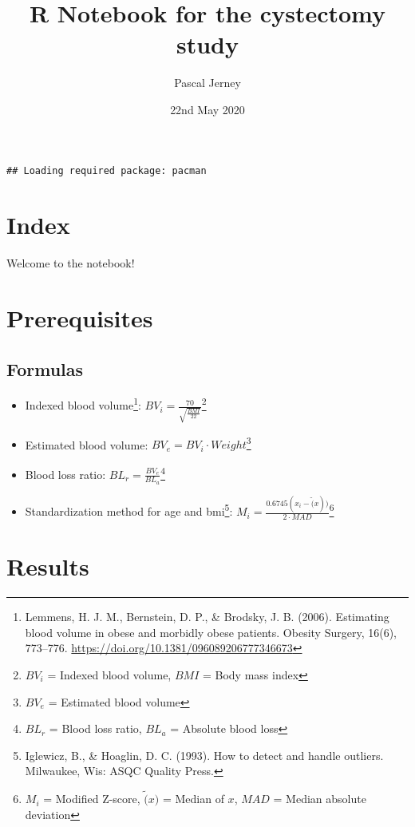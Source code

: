 \documentclass[
]{article}
\title{R Notebook for the cystectomy study}
\author{Pascal Jerney}
\date{22nd May 2020}
\providecommand{\tightlist}{%
  \setlength{\itemsep}{0pt}\setlength{\parskip}{0pt}}
\begin{document}
\maketitle

\begin{verbatim}
## Loading required package: pacman
\end{verbatim}

\hypertarget{index}{%
\section{Index}\label{index}}

Welcome to the notebook!

\hypertarget{prerequisites}{%
\section{Prerequisites}\label{prerequisites}}

\hypertarget{formulas}{%
\subsection{Formulas}\label{formulas}}

\begin{itemize}
\tightlist
\item
  Indexed blood volume\footnote{Lemmens, H. J. M., Bernstein, D. P., \& Brodsky, J. B. (2006). Estimating blood volume in obese and morbidly obese patients. Obesity Surgery, 16(6), 773--776. \url{https://doi.org/10.1381/096089206777346673}}: \(BV_i = \frac{70}{\sqrt{\frac{BMI}{22}}}\)\footnote{\(BV_i\) = Indexed blood volume, \(BMI\) = Body mass index}
\item
  Estimated blood volume: \(BV_e = BV_i \cdot Weight\)\footnote{\(BV_e\) = Estimated blood volume}
\item
  Blood loss ratio: \(BL_r = \frac{BV_e}{BL_a}\)\footnote{\(BL_r\) = Blood loss ratio, \(BL_a\) = Absolute blood loss}
\item
  Standardization method for age and bmi\footnote{Iglewicz, B., \& Hoaglin, D. C. (1993). How to detect and handle outliers. Milwaukee, Wis: ASQC Quality Press.}: \(M_i = \frac{0.6745(x_i - \tilde(x))}{2 \cdot MAD}\)\footnote{\(M_i\) = Modified Z-score, \(\tilde(x)\) = Median of \(x\), \(MAD\) = Median absolute deviation}
\end{itemize}

\hypertarget{results}{%
\section{Results}\label{results}}
\end{document}
